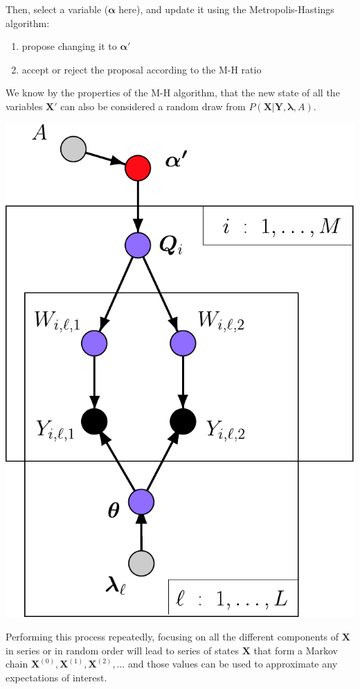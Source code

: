 \begin{minipage}{.47\textwidth}
Then, select a variable ($\bm{\alpha}$ here), and update it using the Metropolis-Hastings algorithm:
\begin{enumerate}
\item propose changing it to $\bm{\alpha'}$
\item accept or reject the proposal according to the M-H ratio 
\end{enumerate}
We know by the properties of the M-H algorithm, that the new state of all the variables $\mathbf{X'}$ can also be considered a random draw from $P(\mathbf{X}|\mathbf{Y},\bm{\lambda},A)$. 
\end{minipage}
\hfill
\begin{minipage}{.51\textwidth}
\vfill
\hfill\includegraphics*[width=.95\textwidth]{illus/PritchSimple2_purpprime.pdf}
\vfill
\end{minipage}
\newpage
Performing this process repeatedly, focusing on all the different components of $\mathbf{X}$ in series or in random order will lead to series of states $\mathbf{X}$ that form a Markov chain $\mathbf{X}^{(0)}, \mathbf{X}^{(1)}, \mathbf{X}^{(2)},\ldots$ and those values can be used to approximate any expectations of interest.

